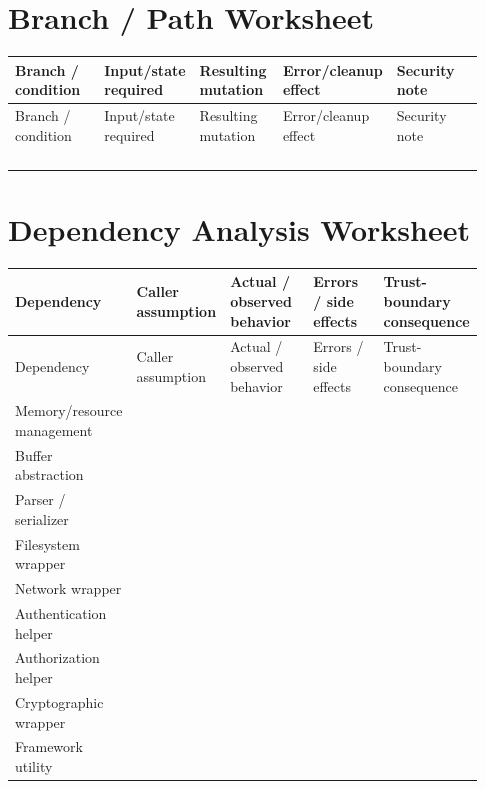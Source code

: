\documentclass[10pt]{article}
\begin{document}
\section{Branch / Path Worksheet}
\begin{longtable}{@{}L{0.20\linewidth}L{0.18\linewidth}L{0.18\linewidth}L{0.17\linewidth}L{0.20\linewidth}@{}}
\toprule
Branch / condition & Input/state required & Resulting mutation & Error/cleanup effect & Security note \\
\midrule
\endfirsthead
\toprule
Branch / condition & Input/state required & Resulting mutation & Error/cleanup effect & Security note \\
\midrule
\endhead
\rule{0pt}{2.7em} & & & & \\
\rule{0pt}{2.7em} & & & & \\
\rule{0pt}{2.7em} & & & & \\
\rule{0pt}{2.7em} & & & & \\
\bottomrule
\end{longtable}

\section{Dependency Analysis Worksheet}
\begin{longtable}{@{}L{0.19\linewidth}L{0.20\linewidth}L{0.19\linewidth}L{0.17\linewidth}L{0.18\linewidth}@{}}
\toprule
Dependency & Caller assumption & Actual / observed behavior & Errors / side effects & Trust-boundary consequence \\
\midrule
\endfirsthead
\toprule
Dependency & Caller assumption & Actual / observed behavior & Errors / side effects & Trust-boundary consequence \\
\midrule
\endhead
Memory/resource management & & & & \\
Buffer abstraction & & & & \\
Parser / serializer & & & & \\
Filesystem wrapper & & & & \\
Network wrapper & & & & \\
Authentication helper & & & & \\
Authorization helper & & & & \\
Cryptographic wrapper & & & & \\
Framework utility & & & & \\
\bottomrule
\end{longtable}
\end{document}
